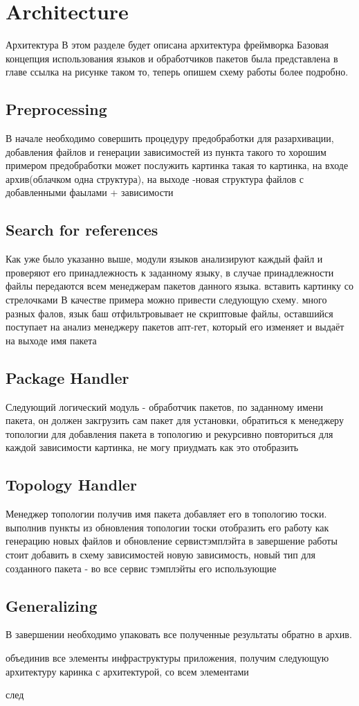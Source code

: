 \section{Architecture}\label{sec:arch}
Архитектура
В этом разделе будет описана архитектура фреймворка
Базовая концепция использования языков и обработчиков пакетов была представлена в главе ссылка на рисунке таком то, теперь опишем схему работы более подробно. 


\fi
\subsection{Preprocessing}
В начале необходимо совершить процедуру предобработки для разархивации, добавления файлов и генерации зависимостей из пункта такого то
хорошим примером предобработки может послужить картинка такая то
картинка, на входе архив(облачком одна структура), на выходе -новая структура файлов с добавленными фаылами + зависимости

\fi
\subsection{Search for references}
Как уже было указанно выше, модули языков анализируют каждый файл и проверяют его принадлежность к заданному языку, в случае принадлежности файлы передаются всем менеджерам пакетов данного языка. 
вставить картинку со стрелочками
В качестве примера можно привести следующую схему.
много разных фалов, язык баш отфильтровывает не скриптовые файлы, оставшийся поступает на анализ менеджеру пакетов апт-гет, который его изменяет и выдаёт на выходе имя пакета


\fi
\subsection{Package Handler}
Следующий логический модуль - обработчик пакетов, по заданному имени пакета, он должен закгрузить сам пакет для установки, обратиться к менеджеру топологии для добавления пакета в топологию и рекурсивно повториться для каждой зависимости
картинка, не могу приудмать как это отобразить


\fi
\subsection{Topology Handler}
Менеджер топологии получив имя пакета добавляет его в топологию тоски. выполнив пункты из обновления топологии тоски
отобразить его работу как генерацию новых файлов и обновление сервистэмплэйта
в завершение работы стоит добавить в схему зависимостей новую зависимость, новый тип для созданного пакета - во все сервис тэмплэйты его использующие


\fi
\subsection{Generalizing}
В завершении необходимо упаковать все полученные результаты обратно в архив.

объединив все элементы инфраструктуры приложения,  получим следующую архитектуру
каринка с архитектурой, со всем элементами

след



\fi